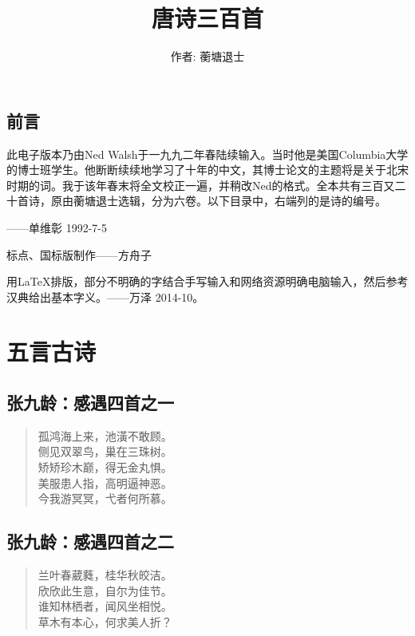 \documentclass[12pt,oneside]{book}
\title{唐诗三百首}
\author{作者: 蘅塘退士}
\newenvironment{shici}{
\begin{verse}
\centering\large\hspace{12pt}}
{\end{verse}}
\begin{document}
\maketitle
\setcounter{tocdepth}{2}
\tableofcontents



\chapter{前言}
此电子版本乃由Ned Walsh于一九九二年春陆续输入。当时他是美国Columbia大学的博士班学生。他断断续续地学习了十年的中文，其博士论文的主题将是关于北宋时期的词。我于该年春末将全文校正一遍，并稍改Ned的格式。全本共有三百又二十首诗，原由蘅塘退士选辑，分为六卷。以下目录中，右端列的是诗的编号。

——单维彰 1992-7-5

标点、国标版制作——方舟子

用\LaTeX 排版，部分不明确的字结合手写输入和网络资源明确电脑输入，然后参考汉典给出基本字义。——万泽 2014-10。




\mainmatter

\part{五言古诗}
\chapter{张九龄：感遇四首之一}
\begin{shici}
孤鸿海上来，池潢不敢顾。\\
侧见双翠鸟，巢在三珠树。\\
矫矫珍木巅，得无金丸惧。\\
美服患人指，高明逼神恶。\\
今我游冥冥，弋者何所慕。
\end{shici}

\chapter{张九龄：感遇四首之二}
\begin{shici}
兰叶春葳蕤，桂华秋皎洁。\\
欣欣此生意，自尔为佳节。\\
谁知林栖者，闻风坐相悦。\\
草木有本心，何求美人折？
\end{shici}
  
\end{document}
